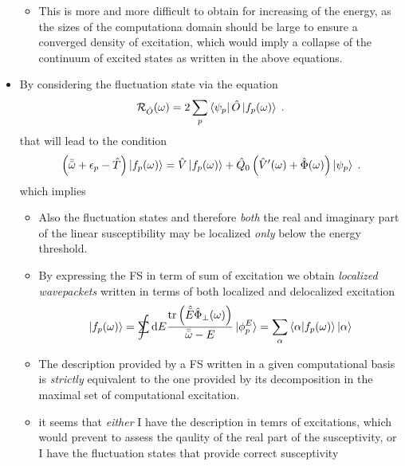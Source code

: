 \documentclass[a4paper]{article}
\newcommand{\dd}{{\rm d}}
\newcommand{\eps}{\epsilon}
\newcommand{\bomega}{\bar\omega}
\newcommand{\bbomega}{\bar{\bomega}}
\newcommand{\ii}{\mathrm{i}}
\newcommand{\sint}{\mathrlap{\displaystyle\int}
\mathrlap{\textstyle\sum}
\phantom{\mathrlap{\displaystyle
\int}\textstyle\sum}}
\newcommand{\be}{\begin{equation}}
\newcommand{\ee}{\end{equation}}
\newcommand{\op}[1]{\hat {#1}}
\newcommand{\trace}[1]{\mathrm{tr}\left(#1\right)}
\newcommand{\opskew}[1]{{\op {#1}}_{\perp}}
\begin{document}
\begin{itemize}
\begin{itemize}
\item This is more and more difficult to obtain for  increasing of the energy, as the sizes of the computationa domain should be large to ensure a converged density of excitation, which would imply a collapse of the continuum of excited states as written in the above equations.
\end{itemize}
\item By considering the fluctuation state
via the equation
\be
{\cal R}_{\op O}(\omega) = 
2 \sum_p \bra{\psi_p}\op O\ket{f_p(\omega)} \;.
\ee
that will lead to the condition
\be
\left(\bbomega+\eps_p -\op T\right)\ket{f_p(\omega)} = \op V\ket{f_p(\omega)} + \op Q_0\left(\op V'(\omega) + \op \Phi(\omega)\right)\ket{\psi_p} \;.
\ee
which implies
\begin{itemize}
\item Also the fluctuation states and therefore \emph{both} the real and imaginary part of the linear susceptibility may be localized \emph{only} below the energy threshold.
\item By expressing the FS in term of sum of excitation we obtain \emph{localized wavepackets} written in terms of both localized and delocalized excitation
\be
\ket{f_p(\omega)} = \sint\dd E \frac{\trace{\op{\tilde E}\opskew{\Phi}(\omega)}}{\bbomega-E} \ket{\phi^E_p} = \sum_\alpha \braket{\alpha|f_p(\omega)} \ket{\alpha}
\ee
\item The description provided by a FS written in a given computational basis is \emph{strictly} equivalent to the one provided by its decomposition in the maximal set of computational excitation.
\item it seems that \emph{either} I have the description in temrs of excitations, which would prevent to assess the qaulity of the real part of the susceptivity, or I have the fluctuation states that provide correct susceptivity 


\end{itemize}
\end{itemize}
\end{document}
